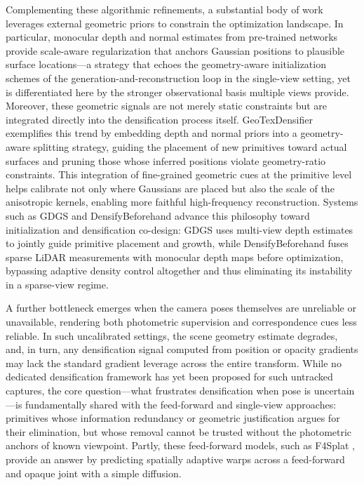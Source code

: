 \documentclass[11pt,a4paper]{article}
\begin{document}
Complementing these algorithmic refinements, a substantial body of work leverages external geometric priors to constrain the optimization landscape. In particular, monocular depth and normal estimates from pre-trained networks provide scale-aware regularization that anchors Gaussian positions to plausible surface locations---a strategy that echoes the geometry-aware initialization schemes of the generation-and-reconstruction loop in the single-view setting, yet is differentiated here by the stronger observational basis multiple views provide. Moreover, these geometric signals are not merely static constraints but are integrated directly into the densification process itself. GeoTexDensifier \cite{arxiv:2412.16809v2} exemplifies this trend by embedding depth and normal priors into a geometry-aware splitting strategy, guiding the placement of new primitives toward actual surfaces and pruning those whose inferred positions violate geometry-ratio constraints. This integration of fine-grained geometric cues at the primitive level helps calibrate not only where Gaussians are placed but also the scale of the anisotropic kernels, enabling more faithful high-frequency reconstruction. Systems such as GDGS \cite{arxiv:2507.00363v1} and DensifyBeforehand \cite{arxiv:2511.19294v1} advance this philosophy toward initialization and densification co-design: GDGS uses multi-view depth estimates to jointly guide primitive placement and growth, while DensifyBeforehand fuses sparse LiDAR measurements with monocular depth maps before optimization, bypassing adaptive density control altogether and thus eliminating its instability in a sparse-view regime.  

A further bottleneck emerges when the camera poses themselves are unreliable or unavailable, rendering both photometric supervision and correspondence cues less reliable. In such uncalibrated settings, the scene geometry estimate degrades, and, in turn, any densification signal computed from position or opacity gradients may lack the standard gradient leverage across the entire transform. While no dedicated densification framework has yet been proposed for such untracked captures, the core question---what frustrates densification when pose is uncertain---is fundamentally shared with the feed-forward and single-view approaches: primitives whose information redundancy or geometric justification argues for their elimination, but whose removal cannot be trusted without the photometric anchors of known viewpoint. Partly, these feed-forward models, such as F4Splat \cite{arxiv:2603.21304v2}, provide an answer by predicting spatially adaptive warps across a feed-forward and opaque joint with a simple diffusion.  
\end{document}
